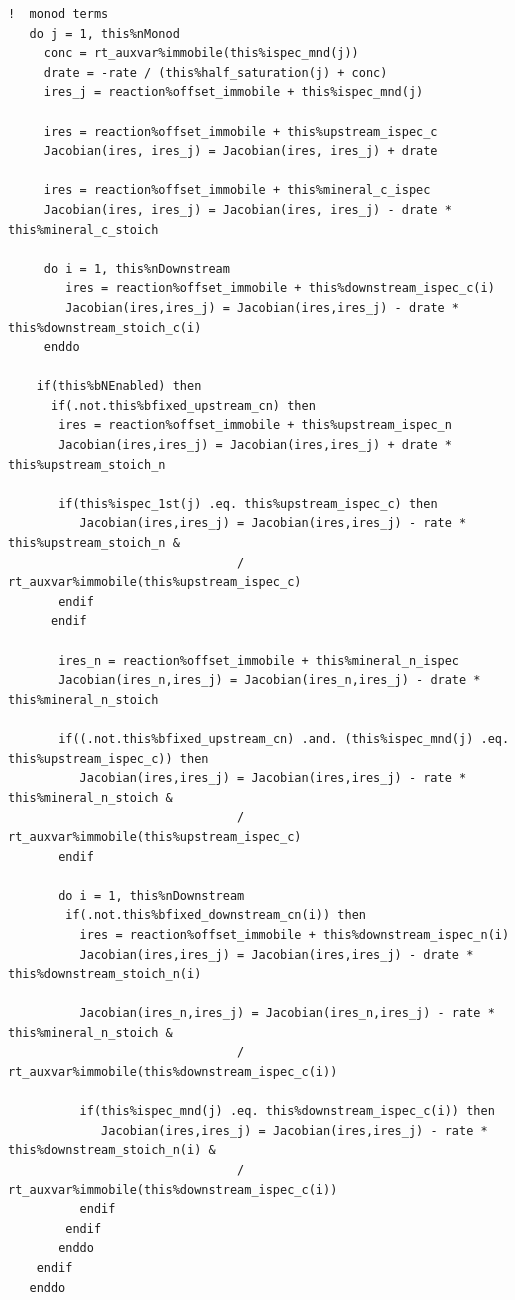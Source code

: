 \documentclass[12pt, a4paper]{article}
\begin{document}
\begin{verbatim}
!  monod terms
   do j = 1, this%nMonod
     conc = rt_auxvar%immobile(this%ispec_mnd(j))  
     drate = -rate / (this%half_saturation(j) + conc) 
     ires_j = reaction%offset_immobile + this%ispec_mnd(j) 

     ires = reaction%offset_immobile + this%upstream_ispec_c      
     Jacobian(ires, ires_j) = Jacobian(ires, ires_j) + drate       

     ires = reaction%offset_immobile + this%mineral_c_ispec      
     Jacobian(ires, ires_j) = Jacobian(ires, ires_j) - drate * this%mineral_c_stoich      

     do i = 1, this%nDownstream
        ires = reaction%offset_immobile + this%downstream_ispec_c(i)      
        Jacobian(ires,ires_j) = Jacobian(ires,ires_j) - drate * this%downstream_stoich_c(i)
     enddo 

    if(this%bNEnabled) then
      if(.not.this%bfixed_upstream_cn) then
       ires = reaction%offset_immobile + this%upstream_ispec_n      
       Jacobian(ires,ires_j) = Jacobian(ires,ires_j) + drate * this%upstream_stoich_n      
       
       if(this%ispec_1st(j) .eq. this%upstream_ispec_c) then
          Jacobian(ires,ires_j) = Jacobian(ires,ires_j) - rate * this%upstream_stoich_n &      
                                / rt_auxvar%immobile(this%upstream_ispec_c)
       endif
      endif
 
       ires_n = reaction%offset_immobile + this%mineral_n_ispec      
       Jacobian(ires_n,ires_j) = Jacobian(ires_n,ires_j) - drate * this%mineral_n_stoich      

       if((.not.this%bfixed_upstream_cn) .and. (this%ispec_mnd(j) .eq. this%upstream_ispec_c)) then
          Jacobian(ires,ires_j) = Jacobian(ires,ires_j) - rate * this%mineral_n_stoich &      
                                / rt_auxvar%immobile(this%upstream_ispec_c)
       endif
       
       do i = 1, this%nDownstream
        if(.not.this%bfixed_downstream_cn(i)) then
          ires = reaction%offset_immobile + this%downstream_ispec_n(i)      
          Jacobian(ires,ires_j) = Jacobian(ires,ires_j) - drate * this%downstream_stoich_n(i)      

          Jacobian(ires_n,ires_j) = Jacobian(ires_n,ires_j) - rate * this%mineral_n_stoich &      
                                / rt_auxvar%immobile(this%downstream_ispec_c(i))

          if(this%ispec_mnd(j) .eq. this%downstream_ispec_c(i)) then
             Jacobian(ires,ires_j) = Jacobian(ires,ires_j) - rate * this%downstream_stoich_n(i) &      
                                / rt_auxvar%immobile(this%downstream_ispec_c(i))
          endif
        endif
       enddo 
    endif
   enddo 


\end{verbatim}
\end{document}
